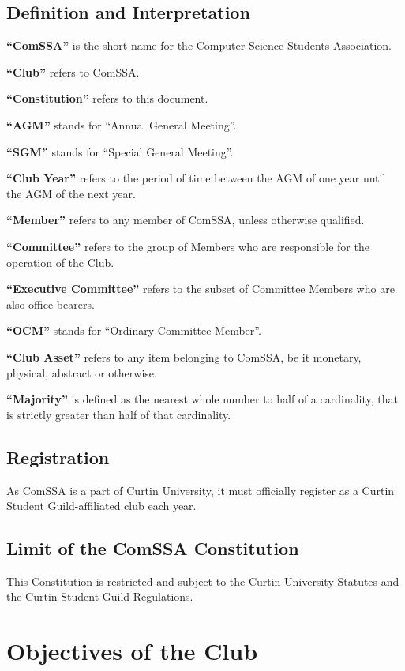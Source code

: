 \documentclass[a4paper,12pt]{article}
\begin{document}
\subsection{Definition and Interpretation}

\textbf{``ComSSA''} is the short name for the Computer Science Students Association.

\textbf{``Club''} refers to ComSSA.

\textbf{``Constitution''} refers to this document.

\textbf{``AGM''} stands for ``Annual General Meeting''.

\textbf{``SGM''} stands for ``Special General Meeting''.

\textbf{``Club Year''} refers to the period of time between the AGM of one year until the AGM of the next year.

\textbf{``Member''} refers to any member of ComSSA, unless otherwise qualified.

\textbf{``Committee''} refers to the group of Members who are responsible for the operation of the Club.

\textbf{``Executive Committee''} refers to the subset of Committee Members who are also office bearers.

\textbf{``OCM''} stands for ``Ordinary Committee Member''.

\textbf{``Club Asset''} refers to any item belonging to ComSSA, be it monetary, physical, abstract or otherwise.

\textbf{``Majority''} is defined as the nearest whole number to half of a cardinality, that is strictly greater than half of that cardinality.

\subsection{Registration}

As ComSSA is a part of Curtin University, it must officially register as a Curtin Student Guild-affiliated club each year.

\subsection{Limit of the ComSSA Constitution}

This Constitution is restricted and subject to the Curtin University Statutes and the Curtin Student Guild Regulations.

\section{Objectives of the Club}
\end{document}
